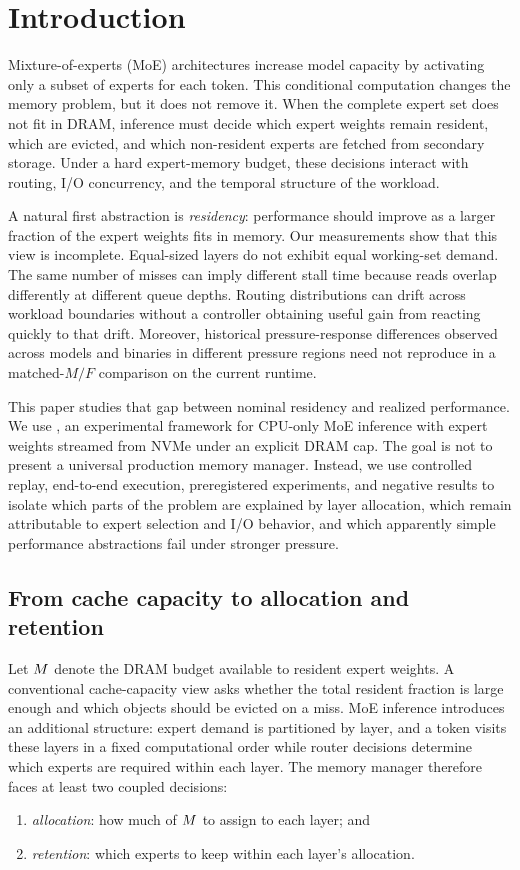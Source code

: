 \section{Introduction}
\label{sec:introduction}

Mixture-of-experts (MoE) architectures increase model capacity by activating only a subset of experts for each token. This conditional computation changes the memory problem, but it does not remove it. When the complete expert set does not fit in DRAM, inference must decide which expert weights remain resident, which are evicted, and which non-resident experts are fetched from secondary storage. Under a hard expert-memory budget, these decisions interact with routing, I/O concurrency, and the temporal structure of the workload.

A natural first abstraction is \emph{residency}: performance should improve as a larger fraction of the expert weights fits in memory. Our measurements show that this view is incomplete. Equal-sized layers do not exhibit equal working-set demand. The same number of misses can imply different stall time because reads overlap differently at different queue depths. Routing distributions can drift across workload boundaries without a controller obtaining useful gain from reacting quickly to that drift. Moreover, historical pressure-response differences observed across models and binaries in different pressure regions need not reproduce in a matched-$M/F$ comparison on the current runtime.

This paper studies that gap between nominal residency and realized performance. We use \argine{}, an experimental framework for CPU-only MoE inference with expert weights streamed from NVMe under an explicit DRAM cap. The goal is not to present a universal production memory manager. Instead, we use controlled replay, end-to-end execution, preregistered experiments, and negative results to isolate which parts of the problem are explained by layer allocation, which remain attributable to expert selection and I/O behavior, and which apparently simple performance abstractions fail under stronger pressure.

\subsection{From cache capacity to allocation and retention}

Let $M$ denote the DRAM budget available to resident expert weights. A conventional cache-capacity view asks whether the total resident fraction is large enough and which objects should be evicted on a miss. MoE inference introduces an additional structure: expert demand is partitioned by layer, and a token visits these layers in a fixed computational order while router decisions determine which experts are required within each layer. The memory manager therefore faces at least two coupled decisions:
\begin{enumerate}
    \item \emph{allocation}: how much of $M$ to assign to each layer; and
    \item \emph{retention}: which experts to keep within each layer's allocation.
\end{enumerate}

